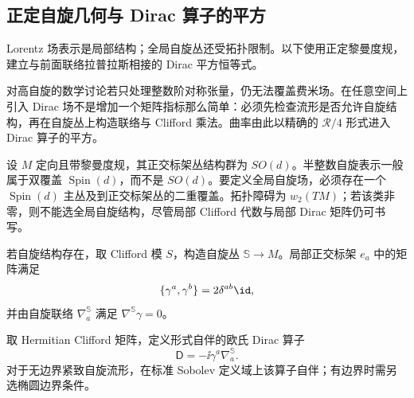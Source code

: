 \subsection{正定自旋几何与 Dirac 算子的平方}

Lorentz 场表示是局部结构；全局自旋丛还受拓扑限制。以下使用正定黎曼度规，建立与前面联络拉普拉斯相接的 Dirac 平方恒等式。

对高自旋的数学讨论若只处理整数阶对称张量，仍无法覆盖费米场。在任意空间上引入 Dirac 场不是增加一个矩阵指标那么简单：必须先检查流形是否允许自旋结构，再在自旋丛上构造联络与 Clifford 乘法。曲率由此以精确的 $\mathcal R/4$ 形式进入 Dirac 算子的平方。

设 $M$ 定向且带黎曼度规，其正交标架丛结构群为 $SO(d)$。半整数自旋表示一般属于双覆盖 $\operatorname{Spin}(d)$，而不是 $SO(d)$。要定义全局自旋场，必须存在一个 $\operatorname{Spin}(d)$ 主丛及到正交标架丛的二重覆盖。拓扑障碍为 $w_2(TM)$；若该类非零，则不能选全局自旋结构，尽管局部 Clifford 代数与局部 Dirac 矩阵仍可书写。

若自旋结构存在，取 Clifford 模 $S$，构造自旋丛 $\mathbb S\to M$。局部正交标架 $e_a$ 中的矩阵满足
\begin{equation}\label{eq:ghs-riemannian-clifford}
 \{\gamma^a,\gamma^b\}=2\delta^{ab}\id,
\end{equation}
并由自旋联络 $\nabla_a^{\mathbb S}$ 满足 $\nabla^{\mathbb S}\gamma=0$。

取 Hermitian Clifford 矩阵，定义形式自伴的欧氏 Dirac 算子
\begin{equation}\label{eq:ghs-geometric-dirac}
 \mathsf D=-\ii\gamma^a\nabla_a^{\mathbb S}.
\end{equation}
对于无边界紧致自旋流形，在标准 Sobolev 定义域上该算子自伴；有边界时需另选椭圆边界条件。

